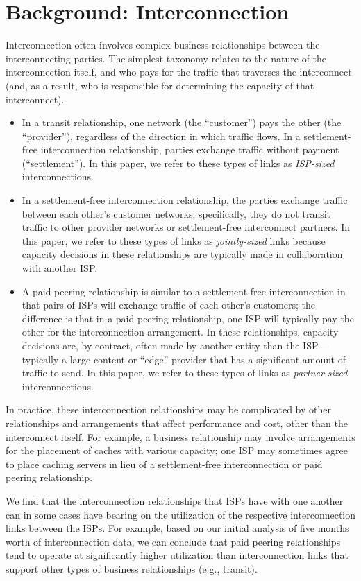 \section{Background: Interconnection}\label{sec:background}

Interconnection often involves complex business relationships between
the interconnecting parties. The simplest taxonomy relates to the nature
of the interconnection itself, and who pays for the traffic that
traverses the interconnect (and, as a result, who is responsible for
determining the capacity of that interconnect). 
\begin{itemize}
\itemsep=-1pt
\item In a transit
relationship, one network (the ``customer'') pays the other (the
``provider''), regardless of the direction in which traffic flows. In a
settlement-free interconnection relationship, parties exchange traffic
without payment (``settlement'').  In this paper, we refer to these
types of links as {\em ISP-sized} interconnections.
\item In a settlement-free
interconnection relationship, the parties exchange traffic between each
other’s customer networks; specifically, they do not transit traffic to
other provider networks or settlement-free interconnect partners.  In
this paper, we refer to these types of links as {\em jointly-sized}
links because capacity decisions in these relationships are typically
made in collaboration with another ISP.
\item A paid
peering relationship is similar to a settlement-free interconnection in
that pairs of ISPs will exchange traffic of each other’s customers; the
difference is that in a paid peering relationship, one ISP will
typically pay the other for the interconnection arrangement.  In these
relationships, capacity decisions are, by contract, often made by
another entity than the ISP---typically a large content or ``edge''
provider that has a significant amount of traffic to send. In this
paper, we refer to these types of links as {\em partner-sized}
interconnections. 
\end{itemize}
\noindent
In practice, these interconnection relationships may be complicated by
other relationships and arrangements that affect performance and cost,
other than the interconnect itself. For example, a business relationship
may involve arrangements for the placement of caches with various
capacity; one ISP may sometimes agree to place caching servers in lieu
of a settlement-free interconnection or paid peering relationship. 

We find that the interconnection relationships
that ISPs have with one another can in some cases have bearing on the
utilization of the respective interconnection links between the
ISPs. For example, based on our initial analysis of five months worth of
interconnection data, we can conclude that paid peering relationships
tend to operate at significantly higher utilization than interconnection
links that support other types of business relationships (e.g.,
transit).

